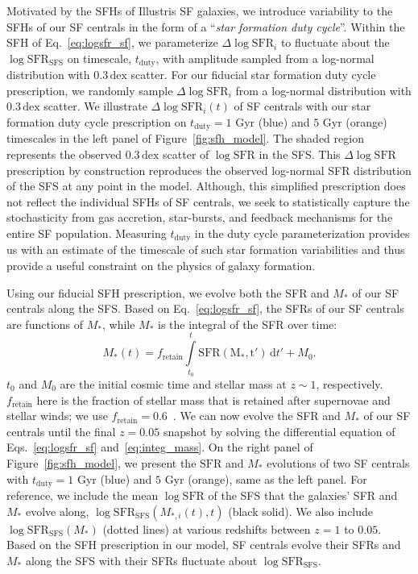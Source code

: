 \documentclass[12pt, letterpaper, preprint, tighten]{aastex62}
\newcommand{\beq}{\begin{equation}}
\newcommand{\eeq}{\end{equation}}
\newcommand{\logsfr}{\log\mathrm{SFR}}
\newcommand{\logsfrsfs}{\log\mathrm{SFR}_\mathrm{SFS}}
\begin{document}
Motivated by the SFHs of Illustris SF galaxies, we introduce variability
to the SFHs of our SF centrals in the form of a ``\emph{star formation duty cycle}''.
Within the SFH of Eq.~\ref{eq:logsfr_sf}, we parameterize $\Delta \logsfr_i$ to
fluctuate about the $\logsfrsfs$ on timescale, $t_\mathrm{duty}$, with
amplitude sampled from a log-normal distribution with $0.3\,\mathrm{dex}$
scatter. For our fiducial star formation duty cycle prescription, we randomly
sample $\Delta \logsfr_i$ from a log-normal distribution with $0.3\,\mathrm{dex}$ scatter.
We illustrate $\Delta \logsfr_i(t)$ of SF centrals with our star formation
duty cycle prescription on $t_\mathrm{duty}=1$ Gyr (blue) and $5$ Gyr (orange)
timescales in the left panel of Figure~\ref{fig:sfh_model}.
The shaded region represents the observed $0.3\,\mathrm{dex}$ scatter of
$\logsfr$ in the SFS. This $\Delta \logsfr$ prescription by construction
reproduces the observed log-normal SFR distribution of the SFS at any point in 
the model. Although, this simplified prescription does not reflect the individual 
SFHs of SF centrals, we seek to statistically capture the stochasticity from 
gas accretion, star-bursts, and feedback mechanisms for the entire SF population.
Measuring $t_\mathrm{duty}$ in the duty cycle parameterization provides us with 
an estimate of the timescale of such star formation variabilities and thus provide 
a useful constraint on the physics of galaxy formation.

Using our fiducial SFH prescription, we evolve both the SFR and $M_*$
of our SF centrals along the SFS. Based on Eq.~\ref{eq:logsfr_sf},
the SFRs of our SF centrals are functions of $M_*$, while $M_*$
is the integral of the SFR over time:
\beq \label{eq:integ_mass}
M_*(t) = f_\mathrm{retain} \int\limits_{t_0}^{t} \mathrm{SFR(M_*, t')}\,\mathrm{d}t' + M_0.
\eeq
$t_0$ and $M_0$ are the initial cosmic time and stellar mass at $z \sim 1$,
respectively. $f_\mathrm{retain}$ here is the fraction of stellar mass
that is retained after supernovae and stellar winds; we use
$f_\mathrm{retain} = 0.6$~\citep{wetzel2013}. We can now evolve the SFR and
$M_*$ of our SF centrals until the final $z=0.05$ snapshot by
solving the differential equation of Eqs.~\ref{eq:logsfr_sf} and~\ref{eq:integ_mass}.
On the right panel of Figure~\ref{fig:sfh_model}, we present the
$\mathrm{SFR}$ and $M_*$ evolutions of two SF centrals with
$t_\mathrm{duty}=1$ Gyr (blue) and $5$ Gyr (orange), same
as the left panel. For reference, we include the mean $\logsfr$ of the SFS
that the galaxies' SFR and $M_*$ evolve along, $\logsfrsfs(M_{*,i}(t), t)$
(black solid). We also include $\logsfrsfs(M_*)$ (dotted lines) at various
redshifts between $z = 1$ to $0.05$. Based on the SFH prescription in our
model, SF centrals evolve their SFRs and $M_*$ along the SFS
with their SFRs fluctuate about $\logsfrsfs$.
\end{document}
